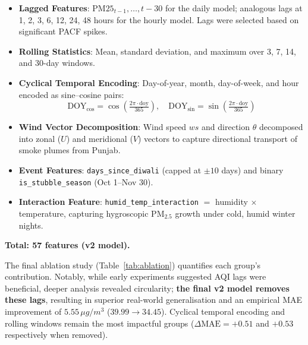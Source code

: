 \documentclass[11pt,a4paper]{article}
\begin{document}
\begin{itemize}
    \item \textbf{Lagged Features}: $\mathrm{PM25}_{t-1}, \ldots, t-30$ for the daily model; analogous lags at 1, 2, 3, 6, 12, 24, 48 hours for the hourly model. Lags were selected based on significant PACF spikes.
    \item \textbf{Rolling Statistics}: Mean, standard deviation, and maximum over 3, 7, 14, and 30-day windows.
    \item \textbf{Cyclical Temporal Encoding}: Day-of-year, month, day-of-week, and hour encoded as sine--cosine pairs:
    \begin{equation}
        \mathrm{DOY}_{\cos} = \cos\!\left(\tfrac{2\pi \cdot \mathrm{doy}}{365}\right), \quad \mathrm{DOY}_{\sin} = \sin\!\left(\tfrac{2\pi \cdot \mathrm{doy}}{365}\right)
    \end{equation}
    \item \textbf{Wind Vector Decomposition}: Wind speed $ws$ and direction $\theta$ decomposed into zonal ($U$) and meridional ($V$) vectors to capture directional transport of smoke plumes from Punjab.
    \item \textbf{Event Features}: \texttt{days\_since\_diwali} (capped at $\pm10$ days) and binary \texttt{is\_stubble\_season} (Oct 1--Nov 30).
    \item \textbf{Interaction Feature}: \texttt{humid\_temp\_interaction} $=$ humidity $\times$ temperature, capturing hygroscopic PM$_{2.5}$ growth under cold, humid winter nights.
\end{itemize}

\textbf{Total: 57 features (v2 model).}

The final ablation study (Table~\ref{tab:ablation}) quantifies each group's contribution. Notably, while early experiments suggested AQI lags were beneficial, deeper analysis revealed circularity; \textbf{the final v2 model removes these lags}, resulting in superior real-world generalisation and an empirical MAE improvement of $5.55\,\mu g/m^3$ ($39.99 \to 34.45$). Cyclical temporal encoding and rolling windows remain the most impactful groups ($\Delta\mathrm{MAE} = +0.51$ and $+0.53$ respectively when removed).
\end{document}

